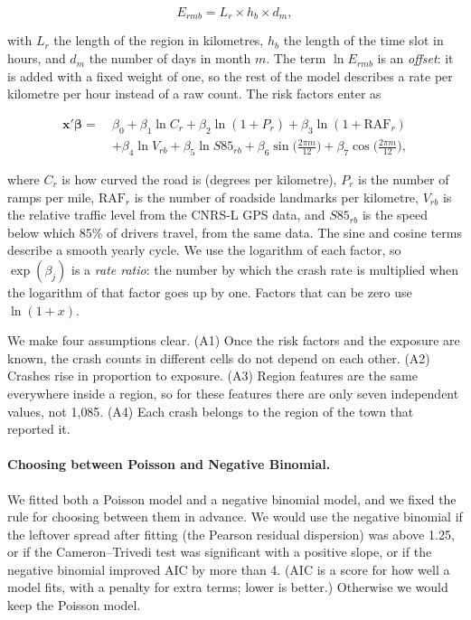 \documentclass[11pt]{article}
\begin{document}
\begin{equation}
E_{rmb}=L_r\times h_b\times d_m,
\label{eq:exposure}
\end{equation}

with $L_r$ the length of the region in kilometres, $h_b$ the length of the
time slot in hours, and $d_m$ the number of days in month $m$. The term
$\ln E_{rmb}$ is an \emph{offset}: it is added with a fixed weight of one, so
the rest of the model describes a rate per kilometre per hour instead of a raw
count. The risk factors enter as

\begin{equation}
\begin{aligned}
\mathbf{x}'\boldsymbol{\beta}=\ &\beta_0
+\beta_1\ln C_r
+\beta_2\ln(1+P_r)
+\beta_3\ln(1+\mathrm{RAF}_r)\\
&+\beta_4\ln V_{rb}
+\beta_5\ln S85_{rb}
+\beta_6\sin\!\Big(\tfrac{2\pi m}{12}\Big)
+\beta_7\cos\!\Big(\tfrac{2\pi m}{12}\Big),
\end{aligned}
\label{eq:linpred}
\end{equation}

where $C_r$ is how curved the road is (degrees per kilometre), $P_r$ is the
number of ramps per mile, $\mathrm{RAF}_r$ is the number of roadside landmarks
per kilometre, $V_{rb}$ is the relative traffic level from the CNRS-L GPS
data, and $S85_{rb}$ is the speed below which 85\% of drivers travel, from the
same data. The sine and cosine terms describe a smooth yearly cycle. We use
the logarithm of each factor, so $\exp(\beta_j)$ is a \emph{rate ratio}: the
number by which the crash rate is multiplied when the logarithm of that factor
goes up by one. Factors that can be zero use $\ln(1+x)$.

We make four assumptions clear. (A1) Once the risk factors and the exposure are
known, the crash counts in different cells do not depend on each other. (A2)
Crashes rise in proportion to exposure. (A3) Region features are the same
everywhere inside a region, so for these features there are only seven
independent values, not 1{,}085. (A4) Each crash belongs to the region of the
town that reported it.

\paragraph{Choosing between Poisson and Negative Binomial.}
We fitted both a Poisson model and a negative binomial model, and we fixed the
rule for choosing between them in advance. We would use the negative binomial
if the leftover spread after fitting (the Pearson residual dispersion) was
above 1.25, or if the Cameron--Trivedi test was significant with a positive
slope, or if the negative binomial improved AIC by more than 4. (AIC is a score
for how well a model fits, with a penalty for extra terms; lower is better.)
Otherwise we would keep the Poisson model.
\end{document}
